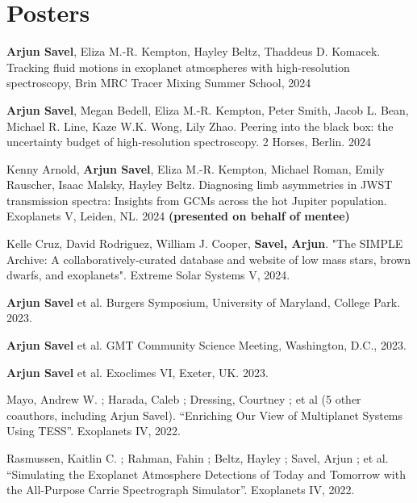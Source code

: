\documentclass[letterpaper,10.5pt]{article}
\newcommand{\resumeSubHeadingListStart}{\begin{itemize}[leftmargin=*]}
\newcommand{\shorterSection}[1]{\vspace{-10pt}\section{#1}}
\begin{document}
\shorterSection{Posters}
\small
  \begin{list}{}{\cvlist}
  \item[{\color{numcolor}\scriptsize13}] \textbf{Arjun Savel}, Eliza M.-R. Kempton, Hayley Beltz, Thaddeus D. Komacek. Tracking fluid motions in exoplanet atmospheres with high-resolution spectroscopy, Brin MRC Tracer Mixing Summer School, 2024
  \item[{\color{numcolor}\scriptsize12}]\textbf{Arjun Savel}, Megan Bedell, Eliza M.-R. Kempton, Peter Smith, Jacob L. Bean, Michael R. Line, Kaze W.K. Wong, Lily Zhao. Peering into the black box: the uncertainty budget of high-resolution spectroscopy. 2 Horses, Berlin. 2024
  \item[{\color{numcolor}\scriptsize11}]Kenny Arnold, \textbf{Arjun Savel}, Eliza M.-R. Kempton, Michael Roman, Emily Rauscher, Isaac Malsky, Hayley Beltz. Diagnosing limb asymmetries in JWST transmission spectra:
 Insights from GCMs across the hot Jupiter population. Exoplanets V, Leiden, NL. 2024 \textbf{(presented on behalf of mentee)}
\item[{\color{numcolor}\scriptsize10}]Kelle Cruz, David Rodriguez, William J. Cooper, \textbf{Savel, Arjun}. "The SIMPLE Archive: A collaboratively-curated database and website of low mass stars, brown dwarfs, and exoplanets". Extreme Solar Systems V, 2024.
  \item[{\color{numcolor}\scriptsize9}]\textbf{Arjun Savel} et al. Burgers Symposium, University of Maryland, College Park. 2023.
  
  \item[{\color{numcolor}\scriptsize8}]\textbf{Arjun Savel} et al. GMT Community Science Meeting, Washington, D.C., 2023.
  
  \item[{\color{numcolor}\scriptsize7}]\textbf{Arjun Savel} et al. Exoclimes VI, Exeter, UK. 2023.

  \item[{\color{numcolor}\scriptsize6}]Mayo, Andrew W. ; Harada, Caleb ; Dressing, Courtney ;  et al (5 other coauthors, including Arjun Savel). ``Enriching Our View of Multiplanet Systems Using TESS''. Exoplanets IV, 2022.

    \item[{\color{numcolor}\scriptsize5}]Rasmussen, Kaitlin C. ; Rahman, Fahin ; Beltz, Hayley ; Savel, Arjun ; et al. ``Simulating the Exoplanet Atmosphere Detections of Today and Tomorrow with the All-Purpose Carrie Spectrograph Simulator''. Exoplanets IV, 2022.
  

\end{list}
\end{document}
